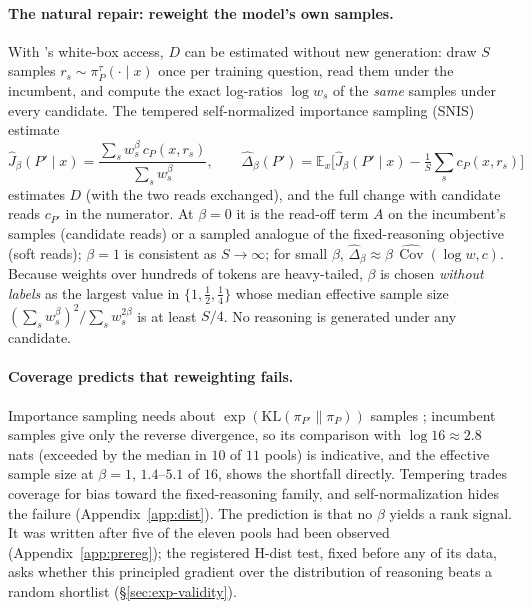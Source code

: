 \paragraph{The natural repair: reweight the model's own samples.} With \greater{}'s white-box
access, $D$ can be estimated without new generation: draw $S$ samples
$r_s\sim\pi_P^\tau(\cdot\mid x)$ once per training question, read them under the incumbent, and
compute the exact log-ratios $\log w_s$ of the \emph{same} samples under every candidate. The
tempered self-normalized importance sampling (SNIS) estimate
\begin{equation}
\widehat{J}_\beta(P'\mid x)=\frac{\sum_s w_s^{\beta}\,c_P(x,r_s)}{\sum_s w_s^{\beta}},\qquad
\widehat{\Delta}_\beta(P')=\mathbb{E}_x\big[\widehat{J}_\beta(P'\mid x)-\tfrac1S\textstyle\sum_s c_P(x,r_s)\big]
\label{eq:snis}
\end{equation}
estimates $D$ (with the two reads exchanged), and the full change with candidate reads $c_{P'}$ in
the numerator. At $\beta=0$ it is the read-off term $A$ on the incumbent's samples (candidate reads)
or a sampled analogue of the fixed-reasoning objective (soft reads); $\beta=1$ is consistent as
$S\to\infty$; for small $\beta$, $\widehat\Delta_\beta\approx\beta\,\widehat{\operatorname{Cov}}(\log
w,c)$. Because weights
over hundreds of tokens are heavy-tailed, $\beta$ is chosen \emph{without labels} as the largest
value in $\{1,\tfrac12,\tfrac14\}$ whose median effective sample size
$(\sum_s w_s^\beta)^2/\sum_s w_s^{2\beta}$ is at least $S/4$. No reasoning is generated under any
candidate.

\paragraph{Coverage predicts that reweighting fails.} Importance sampling needs about
$\exp(\mathrm{KL}(\pi_{P'}\|\pi_P))$ samples \citep{chatterjee2018sample}; incumbent samples give
only the reverse divergence, so its comparison with $\log16\approx2.8$ nats (exceeded by the median
in $10$ of $11$ pools) is indicative, and the effective sample size at $\beta=1$, $1.4$--$5.1$ of
$16$, shows the shortfall directly. Tempering trades coverage for bias toward the fixed-reasoning
family, and self-normalization hides the failure (Appendix~\ref{app:dist}). The prediction is
that no $\beta$ yields a rank signal. It was written after five of the eleven pools had been observed
(Appendix~\ref{app:prereg}); the registered H-dist test, fixed before any of its data, asks whether
this principled gradient over the distribution of reasoning beats a random shortlist
(\S\ref{sec:exp-validity}).
